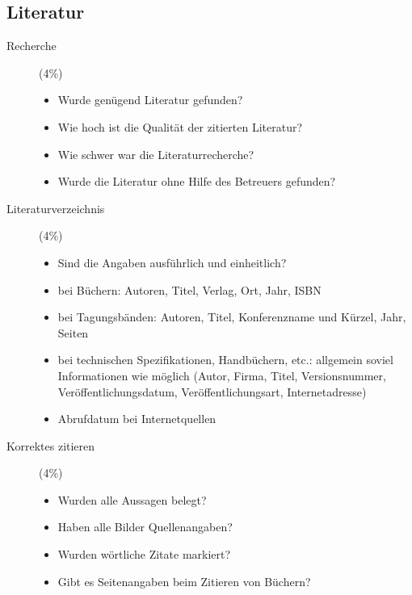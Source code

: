 \documentclass[final,bibliography=totocnumbered]{include/sikseminar}
\begin{document}
\subsection{Literatur}
\begin{description}
  \item[Recherche] (4\%)
    \begin{itemize}
      \item Wurde genügend Literatur gefunden?
      \item Wie hoch ist die Qualität der zitierten Literatur?
      \item Wie schwer war die Literaturrecherche?
      \item Wurde die Literatur ohne Hilfe des Betreuers gefunden?
    \end{itemize}
  \item[Literaturverzeichnis] (4\%)
    \begin{itemize}
      \item Sind die Angaben ausführlich und einheitlich?
      \item bei Büchern: Autoren, Titel, Verlag, Ort, Jahr, ISBN
      \item bei Tagungsbänden: Autoren, Titel, Konferenzname und Kürzel, Jahr, Seiten
      \item bei technischen Spezifikationen, Handbüchern, etc.: allgemein soviel
    Informationen wie möglich (Autor, Firma, Titel, Versionsnummer, Veröffentlichungsdatum, Veröffentlichungsart, Internetadresse)
      \item Abrufdatum bei Internetquellen
    \end{itemize}
  \item[Korrektes zitieren] (4\%)
    \begin{itemize}
      \item Wurden alle Aussagen belegt?
      \item Haben alle Bilder Quellenangaben?
      \item Wurden wörtliche Zitate markiert?
      \item Gibt es Seitenangaben beim Zitieren von Büchern?
    \end{itemize}
\end{description}
\end{document}
